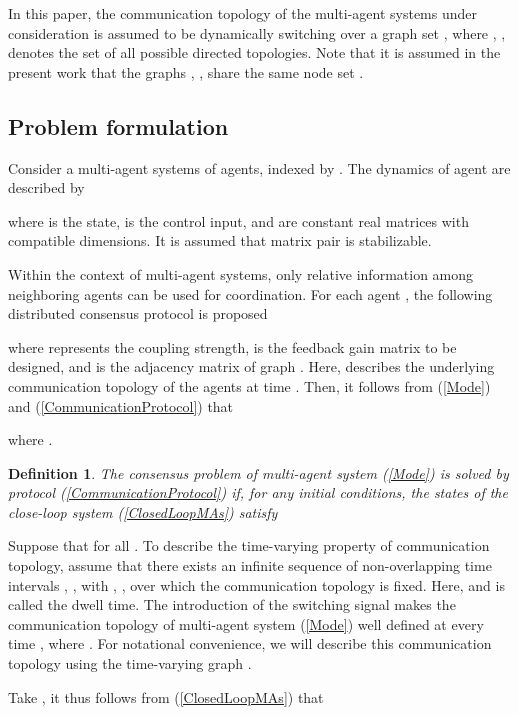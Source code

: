 \documentclass[letterpaper, 10 pt, conference]{ieeeconf}
\newtheorem{definition}{Definition}
\begin{document}
\par
In this paper, the communication topology of
the multi-agent systems under
consideration is assumed to be dynamically
 switching over a graph set , where , , denotes the set of
 all possible directed topologies. Note that it is assumed in the present
 work that the graphs , , share
 the same node set .


\subsection{Problem formulation}
Consider a multi-agent systems of  agents, indexed by . The dynamics
of agent  are described by

where  is the state,  is the control input,
  and  are constant real matrices with compatible dimensions. It is assumed that matrix pair 
is stabilizable.

Within the context of multi-agent systems, only relative information among neighboring agents can be used for coordination. For each agent , the following distributed consensus protocol is proposed

where  represents the coupling strength,  is the feedback gain matrix to be designed, and  is the
adjacency matrix of graph . Here,
 describes the underlying communication
topology of the agents at time . Then, it follows from (\ref{Mode}) and
(\ref{CommunicationProtocol}) that
 
where .
 \par

\begin{definition}\label{ConsensusDefinition}
 The consensus problem of multi-agent system (\ref{Mode}) is solved by
 protocol (\ref{CommunicationProtocol}) if, for any initial conditions, the
 states of the close-loop system (\ref{ClosedLoopMAs}) satisfy

\end{definition}
\par
Suppose that  for all . To describe the time-varying property of communication topology, assume that there exists
an infinite sequence of non-overlapping time intervals ,
, with , ,
over which the communication topology is fixed. Here, 
and   is called the dwell time.
The introduction of the switching signal
 makes the
communication topology of multi-agent system (\ref{Mode}) well defined at
every time , where . For notational convenience, we will
describe this communication topology using the time-varying graph
.

\par
Take , it thus follows from (\ref{ClosedLoopMAs}) that
\end{document}
